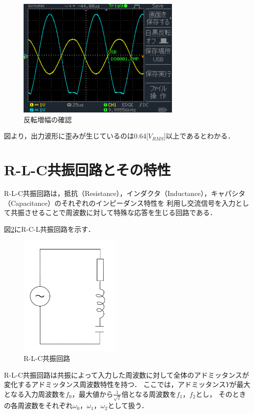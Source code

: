 \documentclass[dvipdfmx,titlepage,a4j]{jsarticle}  %
\numberwithin{equation}{section}
\begin{document}
\begin{figure}[H]
  \centering
  \includegraphics[width=8cm]{../oscilloscope/DS0001.BMP}
  \caption{反転増幅の確認}
  \label{fig:DS0001.BMP}
\end{figure}

図より，出力波形に歪みが生じているのは0.64[$V_{RMS}$]以上であるとわかる．

\section{R-L-C共振回路とその特性}
R-L-C共振回路は，抵抗（Resistance），インダクタ（Inductance），キャパシタ（Capacitance）のそれぞれのインピーダンス特性を
利用し交流信号を入力として共振させることで周波数に対して特殊な応答を生じる回路である．

図\ref{fig:fig6-rcl.jpg}にR-C-L共振回路を示す．
\begin{figure}[H]
  \centering
  \includegraphics[width=5cm]{../fig/fig6-rcl.jpg}
  \caption{R-L-C共振回路}
  \label{fig:fig6-rcl.jpg}
\end{figure}

R-L-C共振回路は共振によって入力した周波数に対して全体のアドミッタンスが変化するアドミッタンス周波数特性を持つ．
ここでは，アドミッタンス$Y$が最大となる入力周波数を$f_0$，最大値から$\frac{1}{\sqrt{2}}$倍となる周波数を$f_1$，$f_2$とし，
そのときの各周波数をそれぞれ$\omega_0$，$\omega_1$，$\omega_2$として扱う．
\end{document}
